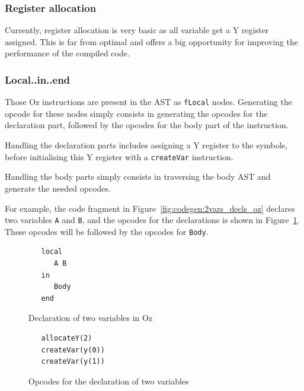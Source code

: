 \documentclass[a4paper]{memoir}
\begin{document}
\subsubsection{Register allocation}
Currently, register allocation is very basic as all variable get a Y register assigned. This is far from optimal and offers a big opportunity for improving the performance of the compiled code.

\subsubsection{Local..in..end}\label{sec:arch:codegen:localin}
Those Oz instructions are present in the AST as \lstinline!fLocal! nodes.
Generating the opcode for these nodes simply consists in generating the opcodes
for the declaration part, followed by the opcodes for the body part of the
instruction.

Handling the declaration parts includes assigning a Y register to the symbols,
before initialising this Y register with a \lstinline!createVar! instruction.

Handling the body parts simply consists in traversing the body AST and generate
the needed opcodes.

For example, the code fragment in Figure~\ref{fig:codegen:2vars_decls_oz} declares two variables \lstinline!A! and
\lstinline!B!, and the opcodes for the declarations is shown in
Figure~\ref{fig:codegen:2vars_decls_opcode}. These opcodes will be followed by
the opcodes for \lstinline!Body!.  
\begin{figure}[h]
\begin{lstlisting}
   local
      A B
   in
      Body
   end
\end{lstlisting}
\caption{Declaration of two variables in Oz}
\label{fig:codegen:2vars_decls_oz}
\begin{lstlisting}
   allocateY(2)
   createVar(y(0))
   createVar(y(1))
\end{lstlisting}
\caption{Opcodes for the declaration of two variables}
\label{fig:codegen:2vars_decls_opcode}
\end{figure}
\end{document}
